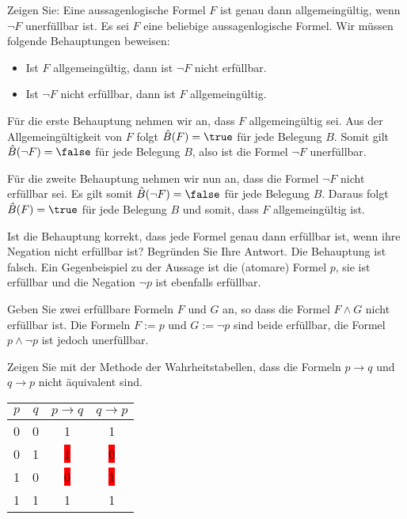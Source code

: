 \begin{example}
    Zeigen Sie: Eine aussagenlogische Formel $F$ ist genau dann allgemeingültig, wenn $\neg F$ unerfüllbar ist.
    \tcblower
    Es sei $F$ eine beliebige aussagenlogische Formel. Wir müssen folgende Behauptungen beweisen:
        \begin{itemize}
            \item Ist $F$ allgemeingültig, dann ist $\neg F$ nicht erfüllbar.
            \item Ist $\neg F$ nicht erfüllbar, dann ist $F$ allgemeingültig.
        \end{itemize}
        Für die erste Behauptung nehmen wir an, dass $F$ allgemeingültig sei. Aus der Allgemeingültigkeit von $F$ folgt $\hat B(F)=\true$ für jede Belegung $B$. Somit gilt $\hat B(\neg F)=\false$ für jede Belegung $B$, also ist die Formel $\neg F$ unerfüllbar.

        Für die zweite Behauptung nehmen wir nun an, dass die Formel $\neg F$ nicht erfüllbar sei. Es gilt somit $\hat B(\neg F)=\false$ für jede Belegung $B$. Daraus folgt $\hat B(F)=\true$ für jede Belegung $B$ und somit, dass $F$ allgemeingültig ist.
\end{example}


\begin{example}
    Ist die Behauptung korrekt, dass jede Formel genau dann erfüllbar ist, wenn ihre Negation nicht erfüllbar ist? Begründen Sie Ihre Antwort.
    \tcblower
    Die Behauptung ist falsch. Ein Gegenbeispiel zu der Aussage ist die (atomare) Formel $p$, sie ist erfüllbar und die Negation $\neg p$ ist ebenfalls erfüllbar.
\end{example}


\begin{example}
    Geben Sie zwei erfüllbare Formeln $F$ und $G$ an, so dass die Formel $F\land G$ nicht erfüllbar ist.
    \tcblower
    Die Formeln $F:=p$ und $G:=\neg p$ sind beide erfüllbar, die Formel $p\land \neg p$ ist jedoch unerfüllbar.
\end{example}

\begin{example}
    Zeigen Sie mit der Methode der Wahrheitstabellen, dass die Formeln $p\to q$ und $q\to p$ nicht äquivalent sind.
    \tcblower
    \begin{center}
            \begin{tabular} {|c|c||c|c|}
                \hline
                $p$ & $q$ & $p\to q$ & $q \to p$ \\
                \hline
                0 & 0 & 1 & 1\\
                0 & 1 & \colorbox{red}{1} & \colorbox{red}{0}\\
                1 & 0 & \colorbox{red}{0} & \colorbox{red}{1}\\
                1 & 1 & 1 & 1\\
                \hline
            \end{tabular}
        \end{center}
\end{example}

